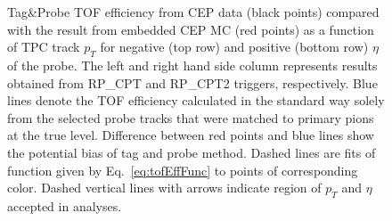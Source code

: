 \begin{figure}[h!]
{\begin{subfigure}[b]{\linewidth}
  \end{subfigure}
}%
\caption[Tag\&Probe TOF efficiency from CEP data compared with the result from embedded CEP MC (divided w.r.t. $\eta$ of the probe).]%
    {Tag\&Probe TOF efficiency from CEP data (black points) compared with the result from embedded CEP MC (red points) as a function of TPC track $p_{T}$ for negative (top row) and positive (bottom row) $\eta$ of the probe. The left and right hand side column represents results obtained from RP\_CPT and RP\_CPT2 triggers, respectively. Blue lines denote the TOF efficiency calculated in the standard way solely from the selected probe tracks that were matched to primary pions at the true level. Difference between red points and blue lines show the potential bias of tag and probe method. Dashed lines are fits of function given by Eq.~\eqref{eq:tofEffFunc} to points of corresponding color. Dashed vertical lines with arrows indicate region of $p_{T}$ and $\eta$ accepted in analyses.}\label{fig:tofEffSyst_etaBins}%
\end{figure}
